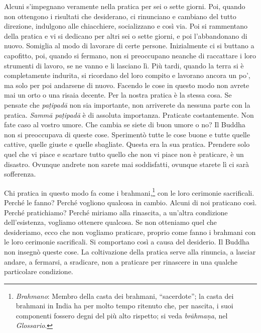 Alcuni s'impegnano veramente nella pratica per sei o sette giorni. Poi,
quando non ottengono i risultati che desiderano, ci rinunciano e
cambiano del tutto direzione, indulgono alle chiacchiere, socializzano e
così via. Poi si rammentano della pratica e vi si dedicano per altri sei
o sette giorni, e poi l'abbandonano di nuovo. Somiglia al modo di
lavorare di certe persone. Inizialmente ci si buttano a capofitto, poi,
quando si fermano, non si preoccupano neanche di raccattare i loro
strumenti di lavoro, se ne vanno e li lasciano lì. Più tardi, quando la
terra si è completamente indurita, si ricordano del loro compito e
lavorano ancora un po', ma solo per poi andarsene di nuovo. Facendo le
cose in questo modo non avrete mai un orto o una risaia decente. Per la
nostra pratica è la stessa cosa. Se pensate che \emph{paṭipadā} non sia
importante, non arriverete da nessuna parte con la pratica. \emph{Sammā
paṭipadā} è di assoluta importanza. Praticate costantemente. Non fate
caso al vostro umore. Che cambia se siete di buon umore o no? Il Buddha
non si preoccupava di queste cose. Sperimentò tutte le cose buone e
tutte quelle cattive, quelle giuste e quelle sbagliate. Questa era la
sua pratica. Prendere solo quel che vi piace e scartare tutto quello che
non vi piace non è praticare, è un disastro. Ovunque andrete non sarete
mai soddisfatti, ovunque starete lì ci sarà sofferenza.

Chi pratica in questo modo fa come i brahmani,\footnote{\emph{Brahmano}: Membro
  della casta dei brahmani, ``sacerdote''; la casta dei brahmani in
  India ha per molto tempo ritenuto che, per nascita, i suoi componenti
  fossero degni del più alto rispetto; si veda \emph{brāhmaṇa}, nel
  \emph{Glossario}.} con le loro cerimonie sacrificali. Perché le fanno?
Perché vogliono qualcosa in cambio. Alcuni di noi praticano così. Perché
pratichiamo? Perché miriamo alla rinascita, a un'altra condizione
dell'esistenza, vogliamo ottenere qualcosa. Se non otteniamo quel che
desideriamo, ecco che non vogliamo praticare, proprio come fanno i
brahmani con le loro cerimonie sacrificali. Si comportano così a causa
del desiderio. Il Buddha non insegnò queste cose. La coltivazione della
pratica serve alla rinuncia, a lasciar andare, a fermarsi, a sradicare,
non a praticare per rinascere in una qualche particolare condizione.

